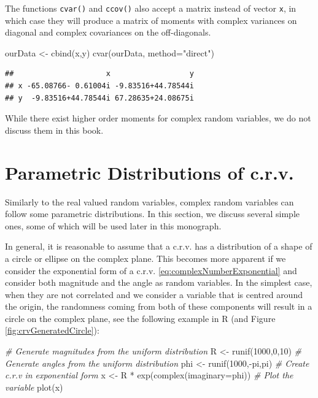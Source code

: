 \documentclass[
]{book}
\newenvironment{Shaded}{\begin{snugshade}}{\end{snugshade}}
\newcommand{\AttributeTok}[1]{\textcolor[rgb]{0.77,0.63,0.00}{#1}}
\newcommand{\CommentTok}[1]{\textcolor[rgb]{0.56,0.35,0.01}{\textit{#1}}}
\newcommand{\DecValTok}[1]{\textcolor[rgb]{0.00,0.00,0.81}{#1}}
\newcommand{\FunctionTok}[1]{\textcolor[rgb]{0.00,0.00,0.00}{#1}}
\newcommand{\NormalTok}[1]{#1}
\newcommand{\OtherTok}[1]{\textcolor[rgb]{0.56,0.35,0.01}{#1}}
\newcommand{\SpecialCharTok}[1]{\textcolor[rgb]{0.00,0.00,0.00}{#1}}
\newcommand{\StringTok}[1]{\textcolor[rgb]{0.31,0.60,0.02}{#1}}
\begin{document}
The functions \texttt{cvar()} and \texttt{ccov()} also accept a matrix instead of vector \texttt{x}, in which case they will produce a matrix of moments with complex variances on diagonal and complex covariances on the off-diagonals.

\begin{Shaded}
\begin{Highlighting}[]
\NormalTok{ourData }\OtherTok{\textless{}{-}} \FunctionTok{cbind}\NormalTok{(x,y)}
\FunctionTok{cvar}\NormalTok{(ourData, }\AttributeTok{method=}\StringTok{"direct"}\NormalTok{)}
\end{Highlighting}
\end{Shaded}

\begin{verbatim}
##                     x                  y
## x -65.08766- 0.61004i -9.83516+44.78544i
## y  -9.83516+44.78544i 67.28635+24.08675i
\end{verbatim}

While there exist higher order moments for complex random variables, we do not discuss them in this book.

\hypertarget{parametric-distributions-of-c.r.v.}{%
\section{Parametric Distributions of c.r.v.}\label{parametric-distributions-of-c.r.v.}}

Similarly to the real valued random variables, complex random variables can follow some parametric distributions. In this section, we discuss several simple ones, some of which will be used later in this monograph.

In general, it is reasonable to assume that a c.r.v. has a distribution of a shape of a circle or ellipse on the complex plane. This becomes more apparent if we consider the exponential form of a c.r.v. \eqref{eq:complexNumberExponential} and consider both magnitude and the angle as random variables. In the simplest case, when they are not correlated and we consider a variable that is centred around the origin, the randomness coming from both of these components will result in a circle on the complex plane, see the following example in R (and Figure \ref{fig:crvGeneratedCircle}):

\begin{Shaded}
\begin{Highlighting}[]
\CommentTok{\# Generate magnitudes from the uniform distribution}
\NormalTok{R }\OtherTok{\textless{}{-}} \FunctionTok{runif}\NormalTok{(}\DecValTok{1000}\NormalTok{,}\DecValTok{0}\NormalTok{,}\DecValTok{10}\NormalTok{)}
\CommentTok{\# Generate angles from the uniform distribution}
\NormalTok{phi }\OtherTok{\textless{}{-}} \FunctionTok{runif}\NormalTok{(}\DecValTok{1000}\NormalTok{,}\SpecialCharTok{{-}}\NormalTok{pi,pi)}
\CommentTok{\# Create c.r.v in exponential form}
\NormalTok{x }\OtherTok{\textless{}{-}}\NormalTok{ R }\SpecialCharTok{*} \FunctionTok{exp}\NormalTok{(}\FunctionTok{complex}\NormalTok{(}\AttributeTok{imaginary=}\NormalTok{phi))}
\CommentTok{\# Plot the variable}
\FunctionTok{plot}\NormalTok{(x)}
\end{Highlighting}
\end{Shaded}
\end{document}
